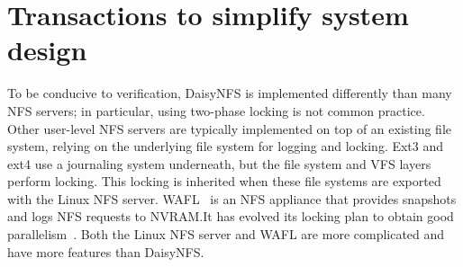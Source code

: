 


\section{Transactions to simplify system design}
\label{sec:rel:txn}

To be conducive to verification, DaisyNFS is implemented differently than
many NFS servers; in particular, using two-phase locking is not common
practice.  Other user-level NFS servers are typically implemented on
top of an existing file system, relying on the underlying file system
for logging and locking. Ext3 and ext4 use a journaling system underneath, but
the file system and VFS layers perform locking. This locking is inherited when
these file systems are exported with the Linux NFS server. WAFL~\cite{wafl:hitz}
is an NFS appliance that provides snapshots and logs NFS requests to
NVRAM.\@  It has evolved its locking plan to obtain good
parallelism~\cite{curtis:wafl}.  Both the Linux NFS server and WAFL
are more complicated and have more features than DaisyNFS.\@

